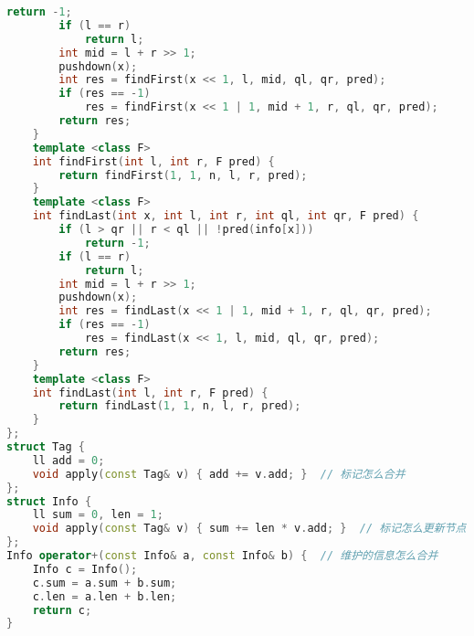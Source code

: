 \begin{lstlisting}[language=C++]
            return -1;
        if (l == r)
            return l;
        int mid = l + r >> 1;
        pushdown(x);
        int res = findFirst(x << 1, l, mid, ql, qr, pred);
        if (res == -1)
            res = findFirst(x << 1 | 1, mid + 1, r, ql, qr, pred);
        return res;
    }
    template <class F>
    int findFirst(int l, int r, F pred) {
        return findFirst(1, 1, n, l, r, pred);
    }
    template <class F>
    int findLast(int x, int l, int r, int ql, int qr, F pred) {
        if (l > qr || r < ql || !pred(info[x]))
            return -1;
        if (l == r)
            return l;
        int mid = l + r >> 1;
        pushdown(x);
        int res = findLast(x << 1 | 1, mid + 1, r, ql, qr, pred);
        if (res == -1)
            res = findLast(x << 1, l, mid, ql, qr, pred);
        return res;
    }
    template <class F>
    int findLast(int l, int r, F pred) {
        return findLast(1, 1, n, l, r, pred);
    }
};
struct Tag {
    ll add = 0;
    void apply(const Tag& v) { add += v.add; }  // 标记怎么合并
};
struct Info {
    ll sum = 0, len = 1;
    void apply(const Tag& v) { sum += len * v.add; }  // 标记怎么更新节点信息
};
Info operator+(const Info& a, const Info& b) {  // 维护的信息怎么合并
    Info c = Info();
    c.sum = a.sum + b.sum;
    c.len = a.len + b.len;
    return c;
}
\end{lstlisting}
